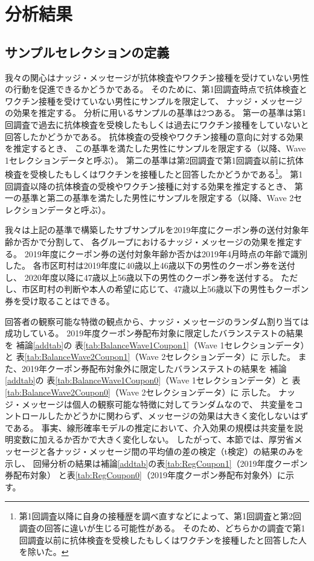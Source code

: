 \documentclass[
  11pt,
  a4paper,
]{article}
\begin{document}
\hypertarget{result}{%
\section{分析結果}\label{result}}

\hypertarget{selection}{%
\subsection{サンプルセレクションの定義}\label{selection}}

我々の関心はナッジ・メッセージが抗体検査やワクチン接種を受けていない男性の行動を促進できるかどうかである。
そのために、第1回調査時点で抗体検査とワクチン接種を受けていない男性にサンプルを限定して、
ナッジ・メッセージの効果を推定する。
分析に用いるサンプルの基準は2つある。
第一の基準は第1回調査で過去に抗体検査を受検したもしくは過去にワクチン接種をしていないと回答したかどうかである。
抗体検査の受検やワクチン接種の意向に対する効果を推定するとき、
この基準を満たした男性にサンプルを限定する（以降、Wave 1セレクションデータと呼ぶ）。
第二の基準は第2回調査で第1回調査以前に抗体検査を受検したもしくはワクチンを接種したと回答したかどうかである\footnote{第1回調査以降に自身の接種歴を調べ直すなどによって、第1回調査と第2回調査の回答に違いが生じる可能性がある。
  そのため、どちらかの調査で第1回調査以前に抗体検査を受検したもしくはワクチンを接種したと回答した人を除いた。}。
第1回調査以降の抗体検査の受検やワクチン接種に対する効果を推定するとき、
第一の基準と第二の基準を満たした男性にサンプルを限定する（以降、Wave 2セレクションデータと呼ぶ）。

我々は上記の基準で構築したサブサンプルを2019年度にクーポン券の送付対象年齢か否かで分割して、
各グループにおけるナッジ・メッセージの効果を推定する。
2019年度にクーポン券の送付対象年齢か否かは2019年4月時点の年齢で識別した。
各市区町村は2019年度に40歳以上46歳以下の男性のクーポン券を送付し、
2020年度以降に47歳以上56歳以下の男性のクーポン券を送付する。
ただし、市区町村の判断や本人の希望に応じて、47歳以上56歳以下の男性もクーポン券を受け取ることはできる。

回答者の観察可能な特徴の観点から、ナッジ・メッセージのランダム割り当ては成功している。
2019年度クーポン券配布対象に限定したバランステストの結果を
補論\ref{addtab}の
表\ref{tab:BalanceWave1Coupon1}（Wave 1セレクションデータ）と
表\ref{tab:BalanceWave2Coupon1}（Wave 2セレクションデータ）に
示した。
また、2019年クーポン券配布対象外に限定したバランステストの結果を
補論\ref{addtab}の
表\ref{tab:BalanceWave1Coupon0}（Wave 1セレクションデータ）と
表\ref{tab:BalanceWave2Coupon0}（Wave 2セレクションデータ）に
示した。
ナッジ・メッセージは個人の観察可能な特徴に対してランダムなので、
共変量をコントロールしたかどうかに関わらず、メッセージの効果は大きく変化しないはずである。
事実、線形確率モデルの推定において、介入効果の規模は共変量を説明変数に加えるか否かで大きく変化しない。
したがって、本節では、厚労省メッセージと各ナッジ・メッセージ間の平均値の差の検定（t検定）の結果のみを示し、
回帰分析の結果は補論\ref{addtab}の表\ref{tab:RegCoupon1}（2019年度クーポン券配布対象）
と表\ref{tab:RegCoupon0}（2019年度クーポン券配布対象外）に示す。
\end{document}
